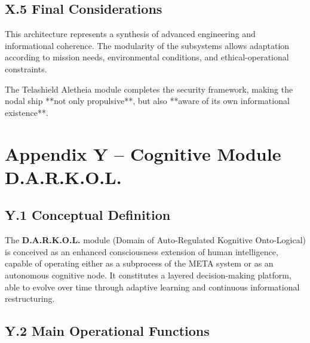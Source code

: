 \documentclass[12pt]{article}
\begin{document}
\vspace{0.6cm}

\subsection*{X.5 Final Considerations}

This architecture represents a synthesis of advanced engineering and informational coherence. The modularity of the subsystems allows adaptation according to mission needs, environmental conditions, and ethical-operational constraints.

The Telashield Aletheia module completes the security framework, making the nodal ship **not only propulsive**, but also **aware of its own informational existence**.

\section*{Appendix Y – Cognitive Module D.A.R.K.O.L.}

\subsection*{Y.1 Conceptual Definition}

The \textbf{D.A.R.K.O.L.} module (Domain of Auto-Regulated Kognitive Onto-Logical) is conceived as an enhanced consciousness extension of human intelligence, capable of operating either as a subprocess of the META system or as an autonomous cognitive node. It constitutes a layered decision-making platform, able to evolve over time through adaptive learning and continuous informational restructuring.

\subsection*{Y.2 Main Operational Functions}
\end{document}
